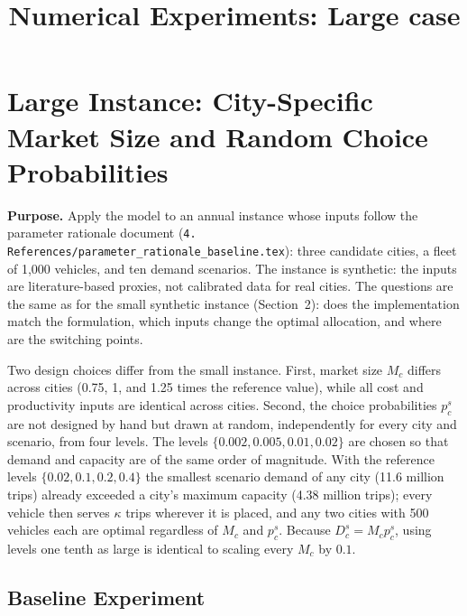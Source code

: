 \documentclass[10pt,a4paper]{article}
\title{Numerical Experiments: Large case}
\author{}
\date{}
\begin{document}
\maketitle
\setcounter{section}{2}

\section{Large Instance: City-Specific Market Size and Random Choice Probabilities}
\label{sec:annual}
\textbf{Purpose.} Apply the model to an annual instance whose inputs follow the parameter rationale document
(\texttt{4. References/parameter\_rationale\_baseline.tex}): three candidate cities, a fleet of 1{,}000 vehicles, and ten demand scenarios.
The instance is synthetic: the inputs are literature-based proxies, not calibrated data for real cities.
The questions are the same as for the small synthetic instance (Section~2): does the implementation match the formulation, which inputs change the optimal allocation, and where are the switching points.

Two design choices differ from the small instance. First, market size $M_c$ differs across cities (0.75, 1, and 1.25 times the reference value), while all cost and productivity inputs are identical across cities.
Second, the choice probabilities $p_c^s$ are not designed by hand but drawn at random, independently for every city and scenario, from four levels.
The levels $\{0.002,0.005,0.01,0.02\}$ are chosen so that demand and capacity are of the same order of magnitude.
With the reference levels $\{0.02,0.1,0.2,0.4\}$ the smallest scenario demand of any city (11.6 million trips) already exceeded a city's maximum capacity (4.38 million trips); every vehicle then serves $\kappa$ trips wherever it is placed, and any two cities with 500 vehicles each are optimal regardless of $M_c$ and $p_c^s$.
Because $D_c^s=M_cp_c^s$, using levels one tenth as large is identical to scaling every $M_c$ by $0.1$.

\subsection{Baseline Experiment}
\end{document}

